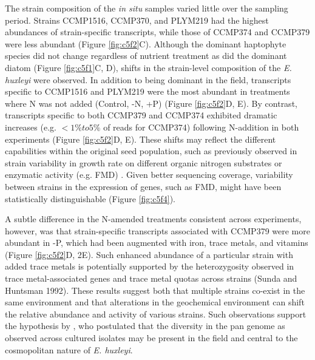 The strain composition of the \textit{in situ} samples varied little over the sampling period. Strains CCMP1516, CCMP370, and PLYM219 had the highest abundances of strain-specific transcripts, while those of CCMP374 and CCMP379 were less abundant (Figure \ref{fig:c5f2}C). Although the dominant haptophyte species did not change regardless of nutrient treatment as did the dominant diatom (Figure \ref{fig:c5f1}C, D), shifts in the strain-level composition of the \textit{E. huxleyi} were observed. In addition to being dominant in the field, transcripts specific to CCMP1516 and PLYM219 were the most abundant in treatments where N was not added (Control, -N, +P) (Figure \ref{fig:c5f2}D, E). By contrast, transcripts specific to both CCMP379 and CCMP374 exhibited dramatic increases (e.g. $<1\% to 5\%$ of reads for CCMP374) following N-addition in both experiments (Figure \ref{fig:c5f2}D, E). These shifts may reflect the different capabilities within the original seed population, such as previously observed in strain variability in growth rate on different organic nitrogen substrates \citep{Strom2009} or enzymatic activity (e.g. FMD) \citep{Palenik1997, Bruhn2010}. Given better sequencing coverage, variability between strains in the expression of genes, such as FMD, might have been statistically distinguishable (Figure \ref{fig:c5f4}).\par

A subtle difference in the N-amended treatments consistent across experiments, however, was that strain-specific transcripts associated with CCMP379 were more abundant in -P, which had been augmented with iron, trace metals, and vitamins (Figure \ref{fig:c5f2}D, 2E). Such enhanced abundance of a particular strain with added trace metals is potentially supported by the heterozygosity observed in trace metal-associated genes \citep{Read2013} and trace metal quotas across strains (Sunda and Huntsman 1992). These results suggest both that multiple strains co-exist in the same environment and that alterations in the geochemical environment can shift the relative abundance and activity of various strains. Such observations support the hypothesis by \citet{Read2013}, who postulated that the diversity in the pan genome as observed across cultured isolates may be present in the field and central to the cosmopolitan nature of \textit{E. huxleyi}. \par


